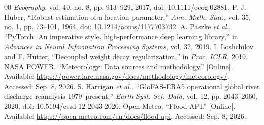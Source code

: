 \documentclass[conference]{IEEEtran}
\begin{document}
\begin{thebibliography}{00}
\emph{Ecography}, vol. 40, no. 8, pp. 913--929, 2017,
doi: 10.1111/ecog.02881.
 P. J. Huber, ``Robust estimation of a location
parameter,'' \emph{Ann. Math. Stat.}, vol. 35, no. 1, pp. 73--101, 1964,
doi: 10.1214/aoms/1177703732.
 A. Paszke \emph{et al.}, ``PyTorch: An imperative style,
high-performance deep learning library,'' in \emph{Advances in Neural
Information Processing Systems}, vol. 32, 2019.
 I. Loshchilov and F. Hutter, ``Decoupled weight decay
regularization,'' in \emph{Proc. ICLR}, 2019.
 NASA POWER, ``Meteorology: Data sources and methodology.''
[Online]. Available: \url{https://power.larc.nasa.gov/docs/methodology/meteorology/}.
Accessed: Sep. 8, 2026.
 S. Harrigan \emph{et al.}, ``GloFAS-ERA5 operational
global river discharge reanalysis 1979--present,'' \emph{Earth Syst. Sci. Data},
vol. 12, pp. 2043--2060, 2020, doi: 10.5194/essd-12-2043-2020.
 Open-Meteo, ``Flood API.'' [Online]. Available:
\url{https://open-meteo.com/en/docs/flood-api}. Accessed: Sep. 8, 2026.
\end{thebibliography}
\end{document}
